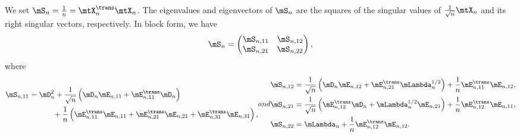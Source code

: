 We set $\mS_n = \frac{1}{n} = \mtX_n^\trans \mtX_n$.  The eigenvalues and eigenvectors of $\mS_n$ are the squares of the singular values of $\frac{1}{\sqrt{n}} \mtX_n$ and its right singular vectors, respectively.  In block form, we have
\begin{equation}
    \mS_n
    =
    \left(
    \begin{matrix}
        \mS_{n,11} & \mS_{n,12} \\
        \mS_{n,21} & \mS_{n,22}
    \end{matrix}
    \right),
\end{equation}
where
\begin{subequations}
\begin{align}
    \begin{split}
    \mS_{n,11}
        &=
            \mD_n^2 
            + 
            \frac{1}{\sqrt{n}} 
            \left( 
                \mD_n \mE_{n,11} + \mE_{n,11}^\trans \mD_n
            \right) \\
            &\phantom{= \mD_n^2} +
            \frac{1}{n}
            \left(
                \mE_{n,11}^\trans \mE_{n,11}
                +
                \mE_{n,21}^\trans \mE_{n,21}
                +
                \mE_{n,31}^\trans \mE_{n,31}
            \right),
    \end{split}
\end{align}
and
\begin{align}
    \mS_{n,12}
        &=
            \frac{1}{\sqrt{n}}
            \left(
                \mD_n \mE_{n,12} + \mE_{n,21}^\trans \mLambda_n^{1/2}
            \right)
            +
            \frac{1}{n}
            \mE_{n,11}^\trans \mE_{n,12}, \\
    \mS_{n,21}
        &=
            \frac{1}{\sqrt{n}}
            \left(
                \mE_{n,12}^\trans \mD_n
                +
                \mLambda_n^{1/2} \mE_{n,21}
            \right)
            +
            \frac{1}{n}
            \mE_{n,12}^\trans \mE_{n,11}, \\
    \mS_{n,22}
        &=
            \mLambda_n
            +
            \frac{1}{n}
            \mE_{n,12}^\trans \mE_{n,12}.
\end{align}
\end{subequations}

